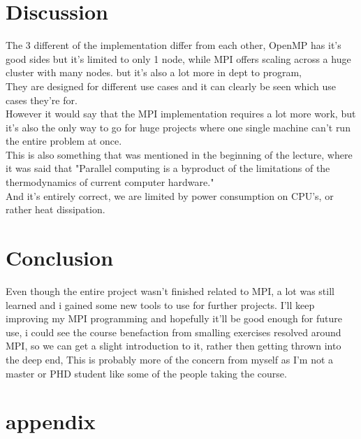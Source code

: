 \documentclass[a4paper,10pt,titlepage]{report}
\begin{document}
\section{Discussion}
The 3 different of the implementation differ from each other, OpenMP has it's good sides but it's limited to only 1 node, while MPI offers scaling across a huge cluster with many nodes. but it's also a lot more in dept to program, \\
They are designed for different use cases and it can clearly be seen which use cases they're for. \\
However it would say that the MPI implementation requires a lot more work, but it's also the only way to go for huge projects where one single machine can't run the entire problem at once. \\
This is also something that was mentioned in the beginning of the lecture, where it was said that "Parallel computing is a byproduct of the limitations of the thermodynamics of current computer hardware." \\
And it's entirely correct, we are limited by power consumption on CPU's, or rather heat dissipation. \\

\section{Conclusion}
Even though the entire project wasn't finished related to MPI, a lot was still learned and i gained some new tools to use for further projects. I'll keep improving my MPI programming and hopefully it'll be good enough for future use, i could see the course benefaction from smalling exercises resolved around MPI, so we can get a slight introduction to it, rather then getting thrown into the deep end, This is probably more of the concern from myself as I'm not a master or PHD student like some of the people taking the course.
\newpage
\section{appendix}
\end{document}
